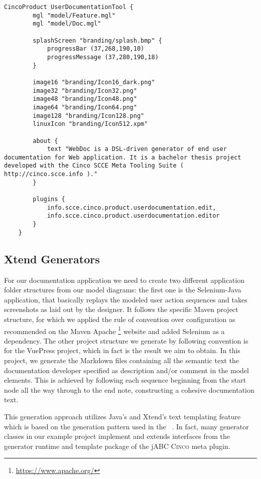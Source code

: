 \begin{lstlisting}[language=MGL, caption={UserDocumentationTool.cpd}]
    CincoProduct UserDocumentationTool {
        mgl "model/Feature.mgl"
        mgl "model/Doc.mgl"
        
        splashScreen "branding/splash.bmp" {
            progressBar (37,268,190,10)
            progressMessage (37,280,190,18)
        }
    
        image16 "branding/Icon16_dark.png"
        image32 "branding/Icon32.png"
        image48 "branding/Icon48.png"
        image64 "branding/Icon64.png"
        image128 "branding/Icon128.png"
        linuxIcon "branding/Icon512.xpm"
	
        about {
            text "WebDoc is a DSL-driven generator of end user documentation for Web application. It is a bachelor thesis project developed with the Cinco SCCE Meta Tooling Suite ( http://cinco.scce.info )."
        }

        plugins {
            info.scce.cinco.product.userdocumentation.edit,
            info.scce.cinco.product.userdocumentation.editor
        }
    }
\end{lstlisting}

\subsection{Xtend Generators}\label{sec:GEN}

For our documentation application we need to create two different application folder structures from our model diagrams: the first one is the Selenium-Java application, that basically replays the modeled user action sequences and takes screenshots as laid out by the designer. It follows the specific Maven project structure, for which we applied the rule of convention over configuration as recommended on the Maven Apache \footnote[1]{\url{https://www.apache.org/}} website and added Selenium as a dependency. The other project structure we generate by following convention is for the VuePress project, which in fact is the result we aim to obtain. In this project, we generate the Markdown files containing all the semantic text the documentation developer specified as description and/or comment in the model elements. This is achieved by following each sequence beginning from the start node all the way through to the end note, constructing a cohesive documentation text.

This generation approach utilizes Java's and Xtend's text templating feature which is based on the generation pattern used in the ~\cite{model-driver-dev_jABC,jabc-home}. In fact, many generator classes in our example project implement and extends interfaces from the generator runtime and template package of the jABC \textsc{Cinco} meta plugin.

